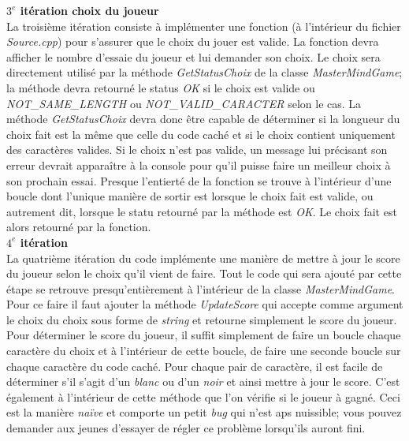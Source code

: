 \documentclass[]{report}
\begin{document}
\begin{adjustwidth}{1.5cm}{0cm}
\textbf{$3^e$ itération choix du joueur}\\
La troisième itération consiste à implémenter une fonction (à l'intérieur du fichier \textit{Source.cpp}) pour s'assurer que le choix du jouer est valide. La fonction devra afficher le nombre d'essaie du joueur et lui demander son choix. Le choix sera directement utilisé par la méthode \textit{GetStatusChoix} de la classe \textit{MasterMindGame}; la méthode devra retourné le status \textit{OK} si le choix est valide ou \textit{NOT\_SAME\_LENGTH} ou \textit{NOT\_VALID\_CARACTER} selon le cas. La méthode \textit{GetStatusChoix} devra donc être capable de déterminer si la longueur du choix fait est la même que celle du code caché et si le choix contient uniquement des caractères valides. Si le choix n'est pas valide, un message lui précisant son erreur devrait apparaître à la console pour qu'il puisse faire un meilleur choix à son prochain essai. Presque l'entierté de la fonction se trouve à l'intérieur d'une boucle dont l'unique manière de sortir est lorsque le choix fait est valide, ou autrement dit, lorsque le statu retourné par la méthode est \textit{OK}. Le choix fait est alors retourné par la fonction.
\\

\textbf{$4^e$ itération}\\
La quatrième itération du code implémente une manière de mettre à jour le score du joueur selon le choix qu'il vient de faire. Tout le code qui sera ajouté par cette étape se retrouve presqu'entièrement à l'intérieur de la classe \textit{MasterMindGame}. Pour ce faire il faut ajouter la méthode \textit{UpdateScore} qui accepte comme argument le choix du choix sous forme de \textit{string} et retourne simplement le score du joueur. Pour déterminer le score du joueur, il suffit simplement de faire un boucle chaque caractère du choix et à l'intérieur de cette boucle, de faire une seconde boucle sur chaque caractère du code caché. Pour chaque pair de caractère, il est facile de déterminer s'il s'agit d'un \textit{blanc} ou d'un \textit{noir} et ainsi mettre à jour le score. C'est également à l'intérieur de cette méthode que l'on vérifie si le joueur à gagné.  Ceci est la manière \textit{naïve} et comporte un petit \textit{bug} qui n'est aps nuissible; vous pouvez demander aux jeunes d'essayer de régler ce problème lorsqu'ils auront fini. 



\end{adjustwidth}
\end{document}
